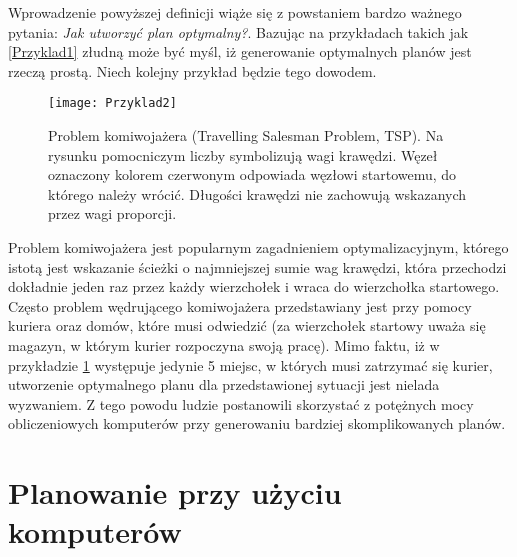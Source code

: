     Wprowadzenie powyższej definicji wiąże się z powstaniem bardzo ważnego pytania: \textit{Jak utworzyć plan optymalny?}. Bazując na przykładach
    takich jak \ref{Przyklad1} złudną może być myśl, iż generowanie optymalnych planów jest rzeczą prostą. Niech kolejny przykład będzie tego
    dowodem.
    \begin{figure}[H]
        \texttt{[image: Przyklad2]}
        \centering
        \caption{Problem komiwojażera (Travelling Salesman Problem, TSP). Na rysunku pomocniczym liczby symbolizują wagi krawędzi. Węzeł oznaczony
        kolorem czerwonym odpowiada węzłowi startowemu, do którego należy wrócić. Długości krawędzi nie zachowują wskazanych przez wagi proporcji.}
        \label{TSP}
    \end{figure}
    Problem komiwojażera jest popularnym zagadnieniem optymalizacyjnym, którego istotą jest wskazanie ścieżki o najmniejszej sumie wag krawędzi, 
    która przechodzi dokładnie jeden raz przez każdy wierzchołek i wraca do wierzchołka startowego. Często problem wędrującego 
    komiwojażera przedstawiany jest przy pomocy kuriera oraz domów, które musi odwiedzić (za wierzchołek startowy uważa się magazyn,
    w którym kurier rozpoczyna swoją pracę). Mimo faktu, iż w przykładzie \ref{TSP} występuje jedynie 5 miejsc, 
    w których musi zatrzymać się kurier, utworzenie optymalnego planu dla przedstawionej sytuacji jest nielada wyzwaniem. Z tego powodu 
    ludzie postanowili skorzystać z potężnych mocy obliczeniowych komputerów przy generowaniu bardziej skomplikowanych planów.


\section{Planowanie przy użyciu komputerów}

